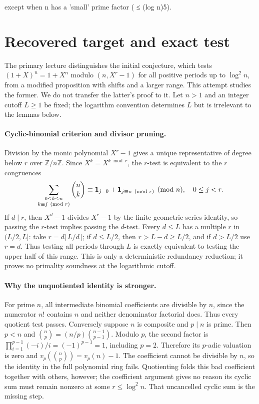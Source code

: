 \documentclass[11pt]{article}
\begin{document}
except when n has a 'small' prime factor ( ≤ (log n)5).

\section{Recovered target and exact test}
The primary lecture distinguishes the initial conjecture, which tests
$(1+X)^n=1+X^n$ modulo $(n,X^r-1)$ for all positive periods up to
$\log^2n$, from a modified proposition with shifts and a larger range.
This attempt studies the former. We do not transfer the latter's proof
to it. Let $n>1$ and an integer cutoff $L\ge1$ be fixed; the
logarithm convention determines $L$ but is irrelevant to the lemmas below.

\paragraph{Cyclic-binomial criterion and divisor pruning.}
Division by the monic polynomial $X^r-1$ gives a unique representative
of degree below $r$ over $\mathbb Z/n\mathbb Z$. Since $X^k=X^{k\bmod r}$,
the $r$-test is equivalent to the $r$ congruences
\[
\sum_{\substack{0\le k\le n\\k\equiv j\pmod r}}\binom nk
 \equiv {\bf1}_{j=0}+{\bf1}_{j\equiv n\pmod r}\pmod n,
\quad 0\le j<r.
\]
If $d\mid r$, then $X^d-1$ divides $X^r-1$ by the finite geometric
series identity, so passing the $r$-test implies passing the $d$-test.
Every $d\le L$ has a multiple $r$ in $(L/2,L]$: take
$r=d\lfloor L/d\rfloor$; if $d\le L/2$, then $r>L-d\ge L/2$,
and if $d>L/2$ use $r=d$. Thus testing all periods through $L$ is
exactly equivalent to testing the upper half of this range. This is
only a deterministic redundancy reduction; it proves no primality
soundness at the logarithmic cutoff.

\paragraph{Why the unquotiented identity is stronger.}
For prime $n$, all intermediate binomial coefficients are divisible
by $n$, since the numerator $n!$ contains $n$ and neither denominator
factorial does. Thus every quotient test passes.
Conversely suppose $n$ is composite and $p\mid n$ is prime. Then
$p<n$ and
$\binom np=(n/p)\binom{n-1}{p-1}$. Modulo $p$, the second factor
is $\prod_{i=1}^{p-1}(-i)/i=(-1)^{p-1}=1$, including $p=2$.
Therefore its $p$-adic valuation is zero and
$v_p(\binom np)=v_p(n)-1$. The coefficient cannot be divisible by
$n$, so the identity in the full polynomial ring fails. Quotienting
folds this bad coefficient together with others, however; the coefficient
argument gives no reason its cyclic sum must remain nonzero at some
$r\le\log^2n$. That uncancelled cyclic sum is the missing step.
\end{document}
